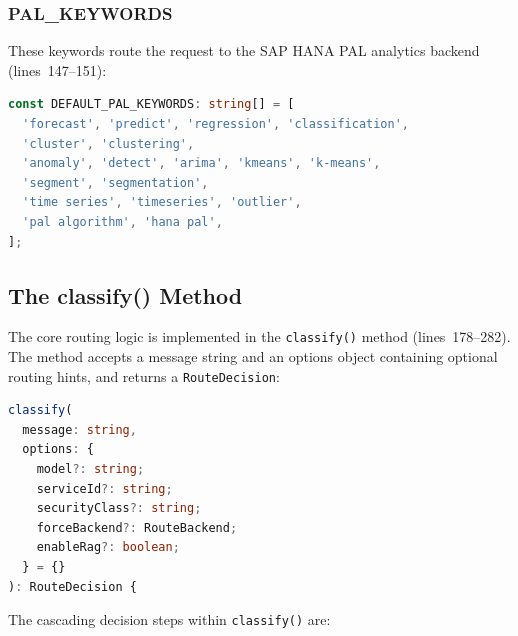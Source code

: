 \documentclass[11pt]{article}
\begin{document}
\subsubsection{PAL\_KEYWORDS}

These keywords route the request to the SAP HANA PAL analytics backend
(lines~147--151):

\begin{lstlisting}[language=TypeScript,caption={DEFAULT\_PAL\_KEYWORDS (intent-router.ts, lines 147--151)},firstnumber=147]
const DEFAULT_PAL_KEYWORDS: string[] = [
  'forecast', 'predict', 'regression', 'classification',
  'cluster', 'clustering',
  'anomaly', 'detect', 'arima', 'kmeans', 'k-means',
  'segment', 'segmentation',
  'time series', 'timeseries', 'outlier',
  'pal algorithm', 'hana pal',
];
\end{lstlisting}

\subsection{The classify() Method}

The core routing logic is implemented in the \texttt{classify()} method
(lines~178--282). The method accepts a message string and an options object
containing optional routing hints, and returns a \texttt{RouteDecision}:

\begin{lstlisting}[language=TypeScript,caption={classify() method signature (intent-router.ts, lines 178--187)},firstnumber=178]
classify(
  message: string,
  options: {
    model?: string;
    serviceId?: string;
    securityClass?: string;
    forceBackend?: RouteBackend;
    enableRag?: boolean;
  } = {}
): RouteDecision {
\end{lstlisting}

The cascading decision steps within \texttt{classify()} are:
\end{document}
